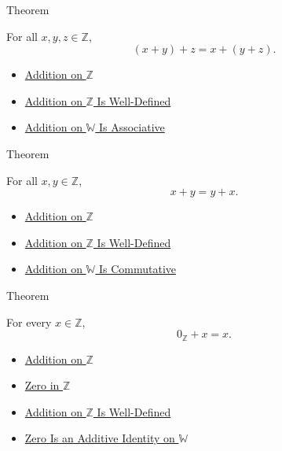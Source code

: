\begin{theorembox}{Theorem}
\begin{theorem}
\label{thm:addition-on-z-associative}
For all $x,y,z\in\mathbb{Z}$,
\[
(x+y)+z=x+(y+z).
\]
\end{theorem}
\end{theorembox}

\begin{dependencies}
\begin{itemize}
  \item \hyperref[def:addition-on-z-classes]{Addition on $\mathbb{Z}$}
  \item \hyperref[thm:addition-on-z-well-defined]{Addition on $\mathbb{Z}$ Is Well-Defined}
  \item \hyperref[thm:addition-on-w-associative]{Addition on $\mathbb{W}$ Is Associative}
\end{itemize}
\end{dependencies}

\begin{theorembox}{Theorem}
\begin{theorem}
\label{thm:addition-on-z-commutative}
For all $x,y\in\mathbb{Z}$,
\[
x+y=y+x.
\]
\end{theorem}
\end{theorembox}

\begin{dependencies}
\begin{itemize}
  \item \hyperref[def:addition-on-z-classes]{Addition on $\mathbb{Z}$}
  \item \hyperref[thm:addition-on-z-well-defined]{Addition on $\mathbb{Z}$ Is Well-Defined}
  \item \hyperref[thm:addition-on-w-commutative]{Addition on $\mathbb{W}$ Is Commutative}
\end{itemize}
\end{dependencies}

\begin{theorembox}{Theorem}
\begin{theorem}
\label{thm:zero-left-additive-identity-on-z}
For every $x\in\mathbb{Z}$,
\[
0_{\mathbb{Z}}+x=x.
\]
\end{theorem}
\end{theorembox}

\begin{dependencies}
\begin{itemize}
  \item \hyperref[def:addition-on-z-classes]{Addition on $\mathbb{Z}$}
  \item \hyperref[def:zero-in-z]{Zero in $\mathbb{Z}$}
  \item \hyperref[thm:addition-on-z-well-defined]{Addition on $\mathbb{Z}$ Is Well-Defined}
  \item \hyperref[thm:zero-additive-identity-on-w]{Zero Is an Additive Identity on $\mathbb{W}$}
\end{itemize}
\end{dependencies}

